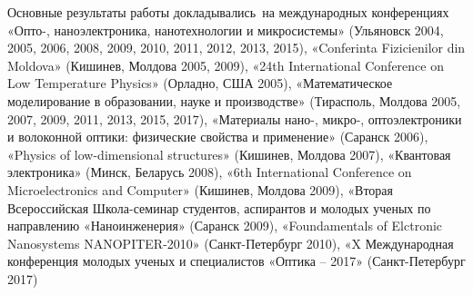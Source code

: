 {\probation}
Основные результаты работы докладывались~на международных конференциях «Опто-, наноэлектроника, нанотехнологии и микросистемы» (Ульяновск 2004, 2005, 2006, 2008, 2009, 2010, 2011, 2012, 2013, 2015), «Conferinta Fizicienilor din Moldova» (Кишинев, Молдова 2005, 2009), «24th International Conference on Low Temperature Physics» (Орладно, США 2005), «Математическое моделирование в образовании, науке и производстве» (Тирасполь, Молдова 2005, 2007, 2009, 2011, 2013, 2015, 2017), «Материалы нано-, микро-, оптоэлектроники и волоконной оптики: физические свойства и применение» (Саранск 2006), «Physics of low-dimensional structures» (Кишинев, Молдова 2007), «Квантовая электроника» (Минск, Беларусь 2008), «6th International Conference on Microelectronics and Computer» (Кишинев, Молдова 2009), «Вторая Всероссийская Школа-семинар студентов, аспирантов и молодых ученых по направлению «Наноинженерия» (Саранск 2009), «Foundamentals of Elctronic Nanosystems NANOPITER-2010» (Санкт-Петербург 2010), «X Международная конференция молодых ученых и специалистов «Оптика – 2017» (Санкт-Петербург 2017)



